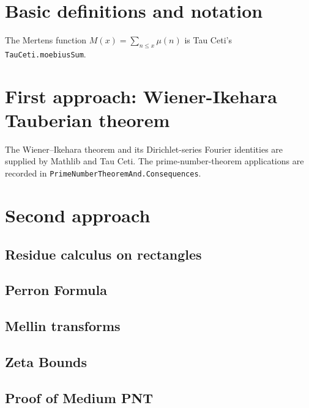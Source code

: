\chapter{Basic definitions and notation}\label{defs-chapter}

The Mertens function $M(x)=\sum_{n\le x}\mu(n)$ is Tau Ceti's \texttt{TauCeti.moebiusSum}.


\chapter{First approach: Wiener-Ikehara Tauberian theorem}\label{wiener-ikehara-chapter}

The Wiener--Ikehara theorem and its Dirichlet-series Fourier identities are supplied
by Mathlib and Tau Ceti. The prime-number-theorem applications are recorded in
\texttt{PrimeNumberTheoremAnd.Consequences}.

\chapter{Second approach}\label{second-approach-chapter}

\section{Residue calculus on rectangles}

\section{Perron Formula}

\section{Mellin transforms}

\section{Zeta Bounds}

\section{Proof of Medium PNT}



